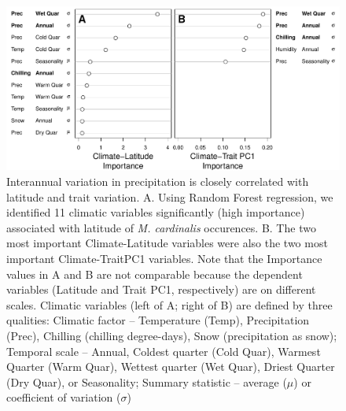 \documentclass[11pt, oneside]{article}
\begin{document}

\begin{figure}[h!]
	\centerline{\includegraphics[width=1\textwidth]{Figures/Figure_ClimVarImp.pdf}}
	\fontsize{10}{12}
	\selectfont
	\caption[Interannual variation in precipitation is closely correlated with latitude and trait variation]{Interannual variation in precipitation is closely correlated with latitude and trait variation. A. Using Random Forest regression, we identified 11 climatic variables significantly (high importance) associated with latitude of \textit{M. cardinalis} occurences. B. The two most important Climate-Latitude variables were also the two most important Climate-TraitPC1 variables. Note that the Importance values in A and B are not comparable because the dependent variables (Latitude and Trait PC1, respectively) are on different scales. Climatic variables (left of A; right of B) are defined by three qualities: Climatic factor -- Temperature (Temp), Precipitation (Prec), Chilling (chilling degree-days), Snow (precipitation as snow); Temporal scale -- Annual, Coldest quarter (Cold Quar), Warmest Quarter (Warm Quar), Wettest quarter (Wet Quar), Driest Quarter (Dry Quar), or Seasonality; Summary statistic -- average ($\mu$) or coefficient of variation ($\sigma$)}
	\label{fig:Fig_ClimVarImp}
\end{figure}


\end{document}

